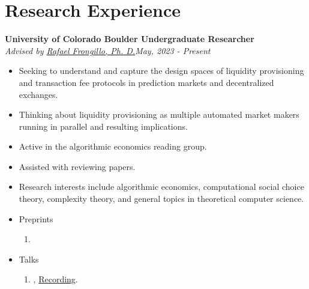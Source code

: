 \documentclass[a4paper,20pt]{article}
\begin{document}
    \section{Research Experience}
    \textbf{University of Colorado Boulder \hfill{Undergraduate Researcher}} \\
    \emph{Advised by \href{https://raf.prof}{Rafael Frongillo, Ph. D.}}\hfill{\textit{May, 2023 - Present}}
    \\
    \begin{itemize}[label=-]
      \vspace{-5pt}
      \item Seeking to understand and capture the design spaces of liquidity provisioning and transaction fee protocols in prediction markets and decentralized exchanges.
      \vspace{-5pt}
      \item Thinking about liquidity provisioning as multiple automated market makers running in parallel and resulting implications.
      \vspace{-5pt}
      \item Active in the algorithmic economics reading group.
      \vspace{-5pt}
      \item Assisted with reviewing papers.
      \vspace{-5pt}
      \item Research interests include algorithmic economics, computational social choice theory, complexity theory, and general topics in theoretical computer science.
    \end{itemize}
    \begin{itemize}
      \item Preprints
      \begin{enumerate}
        \item {}
      \end{enumerate}
      \item Talks
      \begin{enumerate}
        \item {}, \href{https://www.youtube.com/watch?v=JWsXMNSOygA}{Recording}.
      \end{enumerate}
    \end{itemize}
\end{document}

